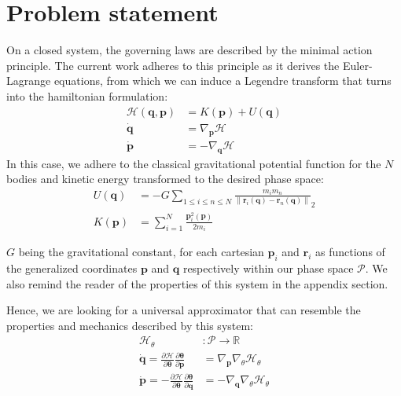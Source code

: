 \documentclass[draft]{agujournal2019}
\newcommand{\norm}[1]{\left\lVert#1\right\rVert}
\begin{document}
\section{Problem statement}
On a closed system, the governing laws are described by the minimal action principle. The current work adheres to this principle as it derives the Euler-Lagrange equations, from which we can induce a Legendre transform that turns into the hamiltonian formulation:
\begin{align}
    \mathcal{H}\left(\mathbf{q}, \mathbf{p}\right) &= K\left(\mathbf{p}\right)+ U\left(\mathbf{q}\right) \\
    \dot{\mathbf{q}} &= \nabla_\mathbf{p} \mathcal{H} \\
    \dot{\mathbf{p}} &= - \nabla_\mathbf{q} \mathcal{H}
\end{align}
In this case, we adhere to the classical gravitational potential function for the $N$ bodies and kinetic energy transformed to the desired phase space:
\begin{align*}
    U(\mathbf{q}) &= - G \sum_{1 \leq i \leq n \leq N} \frac{m_i m_n}{\norm{\mathbf{r}_i\left(\mathbf{q}\right) - \mathbf{r}_n\left(\mathbf{q}\right)}}_2 \\
    K(\mathbf{p}) &= \sum_{i = 1}^{N} \frac{\mathbf{p}_i^2\left(\mathbf{p}\right)}{2 m_i}
\end{align*}

$G$ being the gravitational constant, for each cartesian $\mathbf{p}_i$ and $\mathbf{r}_i$ as functions of the generalized coordinates $\mathbf{p}$ and $\mathbf{q}$ respectively within our phase space $\mathcal{P}$. We also remind the reader of the properties of this system in the appendix section.

Hence, we are looking for a universal approximator that can resemble the properties and mechanics described by this system:
\begin{align*}
    \mathcal{H}_\theta &\colon \mathcal{P} \to \mathbb{R} \\
    \dot{\mathbf{q}} = \frac{\partial \mathcal{H}}{\partial \mathbf{\theta}} \frac{\partial \mathbf{\theta}}{\partial \mathbf{p}} &= \nabla_\mathbf{p} \nabla_\theta \mathcal{H}_\theta \\
    \dot{\mathbf{p}} = - \frac{\partial \mathcal{H}}{\partial \mathbf{\theta}} \frac{\partial \mathbf{\theta}}{\partial \mathbf{q}} &= - \nabla_\mathbf{q} \nabla_\theta \mathcal{H}_\theta \\
\end{align*}
\end{document}
